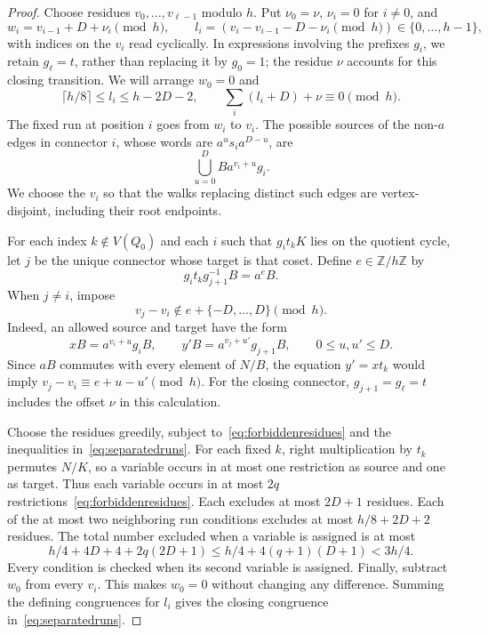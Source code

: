 \documentclass[11pt,a4paper,reqno]{amsart}
\theoremstyle{definition}
\theoremstyle{remark}
\numberwithin{equation}{section}
\newcommand{\Z}{\mathbb Z}
\begin{document}
\begin{proof}
Choose residues $v_0,\ldots,v_{\ell-1}$ modulo $h$. Put $\nu_0=\nu$, $\nu_i=0$ for $i\ne0$, and
\[
 w_i=v_{i-1}+D+\nu_i\pmod h,\qquad
 l_i=(v_i-v_{i-1}-D-\nu_i\pmod h)\in\{0,\ldots,h-1\},
\]
with indices on the $v_i$ read cyclically. In expressions involving the prefixes $g_i$, we retain $g_\ell=t$, rather than replacing it by $g_0=1$; the residue $\nu$ accounts for this closing transition. We will arrange $w_0=0$ and
\begin{equation}\label{eq:separatedruns}
 \lceil h/8\rceil\le l_i\le h-2D-2,\qquad
 \sum_i(l_i+D)+\nu\equiv0\pmod h.
\end{equation}
The fixed run at position $i$ goes from $w_i$ to $v_i$. The possible sources of the non-$a$ edges in connector $i$, whose words are $a^u s_i a^{D-u}$, are
\begin{equation}\label{eq:allowedsource}
 \bigcup_{u=0}^{D}Ba^{v_i+u}g_i.
\end{equation}
We choose the $v_i$ so that the walks replacing distinct such edges are vertex-disjoint, including their root endpoints.

For each index $k\notin V(Q_0)$ and each $i$ such that $g_it_kK$ lies on the quotient cycle, let $j$ be the unique connector whose target is that coset. Define $e\in\Z/h\Z$ by
\[
 g_it_kg_{j+1}^{-1}B=a^eB.
\]
When $j\ne i$, impose
\begin{equation}\label{eq:forbiddenresidues}
 v_j-v_i\notin e+\{-D,\ldots,D\}\pmod h.
\end{equation}
Indeed, an allowed source and target have the form
\[
 xB=a^{v_i+u}g_iB,\qquad
 y'B=a^{v_j+u'}g_{j+1}B,\qquad 0\le u,u'\le D.
\]
Since $aB$ commutes with every element of $N/B$, the equation $y'=xt_k$ would imply $v_j-v_i\equiv e+u-u'\pmod h$. For the closing connector, $g_{j+1}=g_\ell=t$ includes the offset $\nu$ in this calculation.

Choose the residues greedily, subject to~\eqref{eq:forbiddenresidues} and the inequalities in~\eqref{eq:separatedruns}. For each fixed $k$, right multiplication by $t_k$ permutes $N/K$, so a variable occurs in at most one restriction as source and one as target. Thus each variable occurs in at most $2q$ restrictions~\eqref{eq:forbiddenresidues}. Each excludes at most $2D+1$ residues. Each of the at most two neighboring run conditions excludes at most $h/8+2D+2$ residues. The total number excluded when a variable is assigned is at most
\[
 h/4+4D+4+2q(2D+1)
 \le h/4+4(q+1)(D+1)<3h/4.
\]
Every condition is checked when its second variable is assigned. Finally, subtract $w_0$ from every $v_i$. This makes $w_0=0$ without changing any difference. Summing the defining congruences for $l_i$ gives the closing congruence in~\eqref{eq:separatedruns}.


\end{proof}
\end{document}

